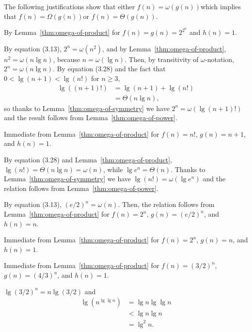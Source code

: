The following justifications show that either $f(n)=\omega(g(n))$\dash which implies that $f(n)=\Omega(g(n))$\dash or $f(n)=\Theta(g(n))$.

\begin{description}[style=nextline]
    \item[$2^{2^{n+1}}=\omega\bigl(2^{2^n}\bigr)$]
    By Lemma~\ref{thm:omega-of-product} for $f(n)=g(n)=2^{2^n}$ and $h(n)=1$.
    \item[$2^{2^n}=\omega((n+1)!)$]
    By equation (3.13), $2^n=\omega(n^2)$, and by Lemma~\ref{thm:omega-of-product}, $n^2=\omega(n\lg n)$, because $n=\omega(\lg n)$.
    Then, by transitivity of $\omega$-notation, $2^n=\omega(n\lg n)$.
    By equation (3.28) and the fact that $0<\lg(n+1)<\lg(n!)$ for $n\ge3$,
    \begin{align*}
        \lg((n+1)!) &= \lg(n+1)+\lg(n!) \\
        &= \Theta(n\lg n),
    \end{align*}
    so thanks to Lemma~\ref{thm:omega-of-symmetry} we have $2^n=\omega(\lg(n+1)!)$ and the result follows from Lemma~\ref{thm:omega-of-power}.
    \item[$(n+1)!=\omega(n!)$]
    Immediate from Lemma~\ref{thm:omega-of-product} for $f(n)=n!$, $g(n)=n+1$, and $h(n)=1$.
    \item[$n!=\omega(e^n)$]
    By equation (3.28) and Lemma~\ref{thm:omega-of-product}, $\lg(n!)=\Theta(n\lg n)=\omega(n)$, while $\lg e^n=\Theta(n)$.
    Thanks to Lemma~\ref{thm:omega-of-symmetry} we have $\lg(n!)=\omega(\lg e^n)$ and the relation follows from Lemma~\ref{thm:omega-of-power}.
    \item[$e^n=\omega(n\cdot2^n)$]
    By equation (3.13), $(e/2)^n=\omega(n)$.
    Then, the relation follows from Lemma~\ref{thm:omega-of-product} for $f(n)=2^n$, $g(n)=(e/2)^n$, and $h(n)=n$.
    \item[$n\cdot2^n=\omega(2^n)$]
    Immediate from Lemma~\ref{thm:omega-of-product} for $f(n)=2^n$, $g(n)=n$, and $h(n)=1$.
    \item[$2^n=\omega((3/2)^n)$]
    Immediate from Lemma~\ref{thm:omega-of-product} for $f(n)=(3/2)^n$, $g(n)=(4/3)^n$, and $h(n)=1$.
    \item[$(3/2)^n=\omega(n^{\lg\lg n})$]
    $\lg(3/2)^n=n\lg(3/2)$ and
    \begin{align*}
        \lg(n^{\lg\lg n}) &= \lg n\lg\lg n \\
        &< \lg n\lg n \\
        &= \lg^2n.
    \end{align*}

\end{description}
